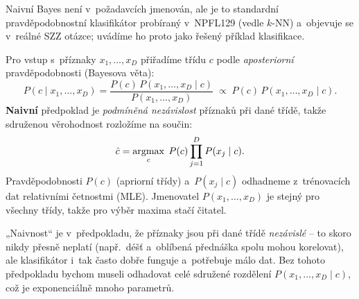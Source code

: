 \begin{poznamka}
Naivní Bayes není v~požadavcích jmenován, ale je to standardní pravděpodobnostní klasifikátor probíraný v~NPFL129 (vedle $k$-NN) a~objevuje se v~reálné SZZ otázce; uvádíme ho proto jako řešený příklad klasifikace.
\end{poznamka}

\begin{definice}
Pro vstup s~příznaky $x_1,\dots,x_D$ přiřadíme třídu $c$ podle \emph{aposteriorní} pravděpodobnosti (Bayesova věta):
\[ P(c\mid x_1,\dots,x_D)=\frac{P(c)\,P(x_1,\dots,x_D\mid c)}{P(x_1,\dots,x_D)}\;\propto\; P(c)\,P(x_1,\dots,x_D\mid c). \]
\textbf{Naivní} předpoklad je \emph{podmíněná nezávislost} příznaků při dané třídě, takže sdruženou věrohodnost rozložíme na součin:
\[ \hat c=\operatorname*{argmax}_{c}\; P(c)\prod_{j=1}^{D} P(x_j\mid c). \]
Pravděpodobnosti $P(c)$ (apriorní třídy) a~$P(x_j\mid c)$ odhadneme z~trénovacích dat relativními četnostmi (MLE). Jmenovatel $P(x_1,\dots,x_D)$ je stejný pro všechny třídy, takže pro výběr maxima stačí čitatel.
\end{definice}

\begin{intuice}
„Naivnost`` je v~předpokladu, že příznaky jsou při dané třídě \emph{nezávislé} -- to skoro nikdy přesně neplatí (např.\ déšť a~oblíbená přednáška spolu mohou korelovat), ale klasifikátor i~tak často dobře funguje a~potřebuje málo dat. Bez tohoto předpokladu bychom museli odhadovat celé sdružené rozdělení $P(x_1,\dots,x_D\mid c)$, což je exponenciálně mnoho parametrů.
\end{intuice}

